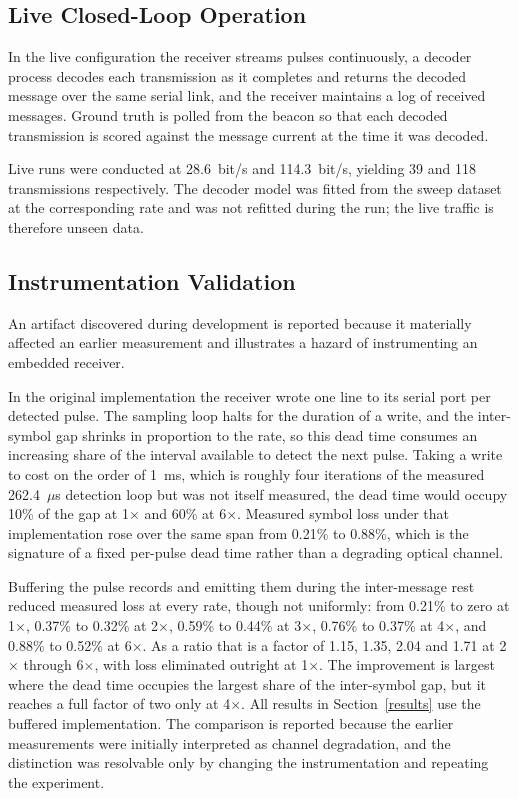 \subsection{Live Closed-Loop Operation}

In the live configuration the receiver streams pulses continuously, a decoder
process decodes each transmission as it completes and returns the decoded
message over the same serial link, and the receiver maintains a log of received
messages. Ground truth is polled from the beacon so that each decoded
transmission is scored against the message current at the time it was decoded.

Live runs were conducted at 28.6~bit/s and 114.3~bit/s, yielding 39 and 118
transmissions respectively. The decoder model was fitted from the sweep dataset
at the corresponding rate and was not refitted during the run; the live traffic
is therefore unseen data.

\subsection{Instrumentation Validation}

An artifact discovered during development is reported because it materially
affected an earlier measurement and illustrates a hazard of instrumenting an
embedded receiver.

In the original implementation the receiver wrote one line to its serial port
per detected pulse. The sampling loop halts for the duration of a write, and
the inter-symbol gap shrinks in proportion to the rate, so this dead time
consumes an increasing share of the interval available to detect the next
pulse. Taking a write to cost on the order of 1~ms, which is roughly four
iterations of the measured 262.4~$\mu$s detection loop but was not itself
measured, the dead time would occupy 10\% of the gap at 1$\times$ and 60\% at
6$\times$. Measured symbol loss under that implementation rose over the same
span from 0.21\% to 0.88\%, which is the signature of a fixed per-pulse dead
time rather than a degrading optical channel.

Buffering the pulse records and emitting them during the inter-message rest
reduced measured loss at every rate, though not uniformly: from 0.21\% to zero
at 1$\times$, 0.37\% to 0.32\% at 2$\times$, 0.59\% to 0.44\% at 3$\times$,
0.76\% to 0.37\% at 4$\times$, and 0.88\% to 0.52\% at 6$\times$. As a ratio
that is a factor of 1.15, 1.35, 2.04 and 1.71 at 2$\times$ through 6$\times$,
with loss eliminated outright at 1$\times$. The improvement is largest where
the dead time occupies the largest share of the inter-symbol gap, but it
reaches a full factor of two only at 4$\times$. All results in
Section~\ref{results} use the buffered implementation. The comparison is
reported because the earlier measurements were initially interpreted as channel
degradation, and the distinction was resolvable only by changing the
instrumentation and repeating the experiment.
